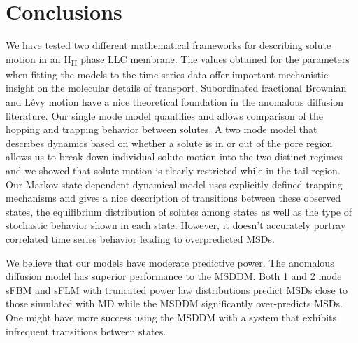 \documentclass{article}
\begin{document}

  \section{Conclusions}
  
  
  We have tested two different mathematical frameworks for describing solute
  motion in an H\textsubscript{II} phase LLC membrane. The values obtained for
  the parameters when fitting the models to the time series data offer important
  mechanistic insight on the molecular details of transport.
  Subordinated fractional Brownian and L\'evy motion have a nice theoretical 
  foundation in the anomalous diffusion literature. Our single mode model
  quantifies and allows comparison of the hopping and trapping behavior 
  between solutes. A two mode model that describes dynamics based on whether
  a solute is in or out of the pore region allows us to break down individual
  solute motion into the two distinct regimes and we showed that solute motion is
  clearly restricted while in the tail region. Our Markov state-dependent dynamical
  model uses explicitly defined trapping mechanisms and gives a nice description 
  of transitions between these observed states, the equilibrium distribution of 
  solutes among states as well as the type of stochastic behavior shown in each 
  state. However, it doesn't accurately portray correlated time series behavior
  leading to overpredicted MSDs.
  
  We believe that our models have moderate predictive power. 
  The anomalous
  diffusion model has superior performance to the MSDDM. Both 1 and 2 mode 
  sFBM and sFLM with truncated power law distributions predict MSDs close 
  to those simulated with MD while the MSDDM significantly over-predicts MSDs.
  One might have more success using the MSDDM with a system that exhibits
  infrequent transitions between states.
\end{document}
